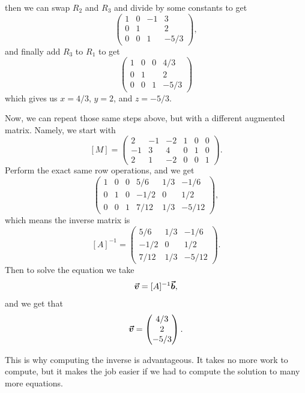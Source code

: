 \documentclass[12pt]{article} %
\begin{document}
\begin{solution}
\[\]
then we can swap $R_2$ and $R_3$ and divide by some constants to get
\[
\left( \begin{array}{ccc|c} 
    1 & 0 & -1 & 3\\
    0 & 1 &  & 2\\
    0 & 0 & 1 & -5/3
\end{array}\right),
\]
and finally add $R_3$ to $R_1$ to get
\[
\left( \begin{array}{ccc|c} 
    1 & 0 & 0 & 4/3\\
    0 & 1 &  & 2\\
    0 & 0 & 1 & -5/3
\end{array}\right)
\]
which gives us $x=4/3$, $y=2$, and $z=-5/3$.
\item Now, we can repeat those same steps above, but with a different augmented matrix. Namely, we start with
\[
[M]=  \left( \begin{array}{ccc|ccc} 
    2 & -1 & -2 &    1 & 0 & 0 \\
    -1 & 3 & 4 &     0 & 1 & 0 \\
    2 & 1 & -2 &     0 & 0 & 1
\end{array}\right).
\]
Perform the exact same row operations, and we get
\[
\left( \begin{array}{ccc|ccc} 
    1 & 0 & 0 &    5/6 & 1/3 & -1/6 \\
    0 & 1 & 0 &     -1/2 & 0 & 1/2 \\
    0 & 0 & 1 &     7/12 & 1/3 & -5/12
\end{array}\right),
\]
which means the inverse matrix is
\[
[A]^{-1}=\begin{pmatrix}
    5/6 & 1/3 & -1/6 \\
    -1/2 & 0 & 1/2 \\
    7/12 & 1/3 & -5/12
\end{pmatrix}.
\]
Then to solve the equation we take
\[
\boldsymbol{\vec{v}} = [A]^{-1}\boldsymbol{\vec{b}},
\]
and we get that
\[
\boldsymbol{\vec{v}} = \begin{pmatrix} 4/3 \\ 2 \\ -5/3 \end{pmatrix}.
\]
\end{solution}
\begin{remark}
This is why computing the inverse is advantageous. It takes no more work to compute, but it makes the job easier if we had to compute the solution to many more equations.
\end{remark}
\end{document}
